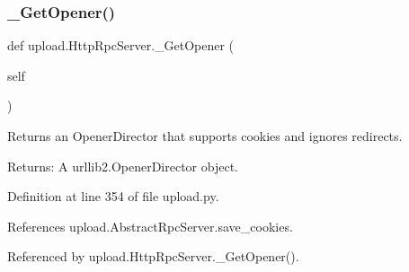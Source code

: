 \mbox{\label{classupload_1_1HttpRpcServer_a4685030df704ec17f020c8790108a05a}} 
\subsubsection{\texorpdfstring{\+\_\+\+Get\+Opener()}{\_GetOpener()}\hspace{0.1cm}{\footnotesize\ttfamily [2/2]}}
{\footnotesize\ttfamily def upload.\+Http\+Rpc\+Server.\+\_\+\+Get\+Opener (\begin{DoxyParamCaption}\item[{}]{self }\end{DoxyParamCaption})\hspace{0.3cm}{\ttfamily [private]}}

\begin{DoxyVerb}Returns an OpenerDirector that supports cookies and ignores redirects.

Returns:
  A urllib2.OpenerDirector object.
\end{DoxyVerb}
 

Definition at line 354 of file upload.\+py.



References upload.\+Abstract\+Rpc\+Server.\+save\+\_\+cookies.



Referenced by upload.\+Http\+Rpc\+Server.\+\_\+\+Get\+Opener().


